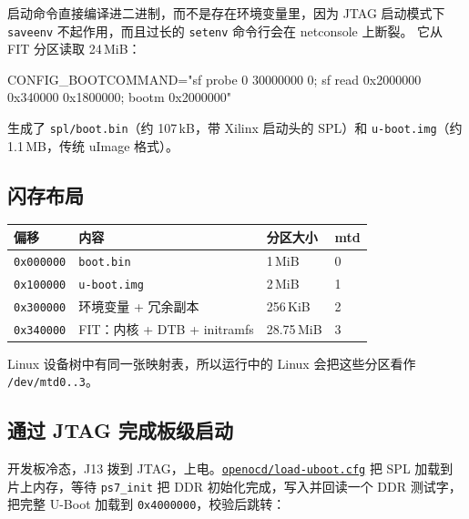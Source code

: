 \documentclass[11pt,a4paper,oneside]{article}
\newcommand{\file}[1]{{\color{bluemid}\nolinkurl{#1}}}
\newcommand{\cmd}[1]{\texttt{#1}}
\newcommand{\repo}{https://github.com/MaxClerkwell/ax7020-bringup}
\newcommand{\rfile}[1]{\href{\repo/blob/master/#1}{\color{bluemid}\nolinkurl{#1}}}
\begin{document}
启动命令直接编译进二进制，而不是存在环境变量里，因为 JTAG 启动模式下
\cmd{saveenv} 不起作用，而且过长的 \cmd{setenv} 命令行会在 netconsole 上断裂。
它从 FIT 分区读取 24\,MiB：

\begin{code}
CONFIG_BOOTCOMMAND="sf probe 0 30000000 0; sf read 0x2000000 0x340000 0x1800000; bootm 0x2000000"
\end{code}


\begin{checkpoint}
生成了 \file{spl/boot.bin}（约 107\,kB，带 Xilinx 启动头的 SPL）和
\file{u-boot.img}（约 1.1\,MB，传统 uImage 格式）。
\end{checkpoint}

\subsection{闪存布局}

\begin{center}\small
\begin{tabular}{@{}llll@{}}
\toprule
偏移 & 内容 & 分区大小 & mtd \\
\midrule
\cmd{0x000000} & \file{boot.bin} & 1\,MiB & 0 \\
\cmd{0x100000} & \file{u-boot.img} & 2\,MiB & 1 \\
\cmd{0x300000} & 环境变量 + 冗余副本 & 256\,KiB & 2 \\
\cmd{0x340000} & FIT：内核 + DTB + initramfs & 28.75\,MiB & 3 \\
\bottomrule
\end{tabular}
\end{center}

Linux 设备树中有同一张映射表，所以运行中的 Linux 会把这些分区看作
\file{/dev/mtd0..3}。

\subsection{通过 JTAG 完成板级启动}

开发板冷态，J13 拨到 JTAG，上电。\rfile{openocd/load-uboot.cfg} 把 SPL 加载到
片上内存，等待 \cmd{ps7\_init} 把 DDR 初始化完成，写入并回读一个 DDR 测试字，
把完整 U-Boot 加载到 \cmd{0x4000000}，校验后跳转：
\end{document}
